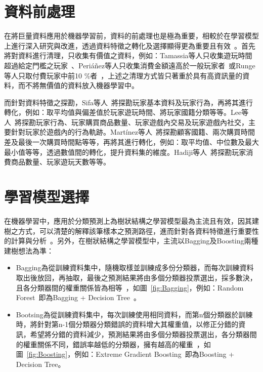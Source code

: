 \section{資料前處理}

在將巨量資料應用於機器學習前，資料的前處理也是極為重要，相較於在學習模型上進行深入研究與改進，透過資料特徵之轉化及選擇顯得更為重要且有效~\cite{lee2018game}。首先將對資料進行清理，只收集有價值之資料，例如：Tamassia等人只收集遊玩時間超過給定門檻之玩家~\cite{tamassia2016predicting}、Periáñez等人只收集消費金額遠高於一般玩家者~\cite{perianez2016churn}或Runge等人只取付費玩家中前10 \%者~\cite{runge2014churn}，上述之清理方式皆只著重於具有高資訊量的資料，而不將無價值的資料放入機器學習中。

而針對資料特徵之探勘，Sifa等人~\cite{sifa2015predicting}將探勘玩家基本資料及玩家行為，再將其進行轉化，例如：取平均值與偏差值於玩家遊玩時間、將玩家國籍分類等等。Lee等人~\cite{lee2016predicting}將探勘玩家行為、玩家購買商品數量、玩家遊戲內交易及玩家遊戲內社交，主要針對玩家於遊戲內的行為軌跡。Martínez等人~\cite{martinez2020machine}將探勘顧客國籍、兩次購買時間差及最後一次購買時間點等等，再將其進行轉化，例如：取平均值、中位數及最大最小值等等，透過數值間的轉化，提升資料集的維度。Hadiji等人~\cite{6932876}將探勘玩家消費商品數量、玩家遊玩天數等等。

\section{學習模型選擇}

在機器學習中，應用於分類預測上為樹狀結構之學習模型最為主流且有效，因其建樹之方式，可以清楚的解釋該筆樣本之預測路徑，進而針對各資料特徵進行重要性的計算與分析~\cite{lee2018game}。另外，在樹狀結構之學習模型中，主流以Bagging及Boosting兩種建樹想法為準：

\begin{itemize}
    \item Bagging為從訓練資料集中，隨機取樣並訓練成多份分類器，而每次訓練資料取出後放回，再抽取，最後之預測結果將由多個分類器投票選出，採多數決，且各分類器間的權重關係皆為相等~\cite{breiman1996bagging}，如圖~\ref{fig:Bagging}，例如：Random Forest~\cite{breiman2001random}即為Bagging + Decision Tree~\cite{breiman1984classification}。
    \item Bootsing為從訓練資料集中，每次訓練使用相同資料，而第n個分類器於訓練時，將針對第n-1個分類器分類錯誤的資料增大其權重值，以修正分錯的資訊，希望將分錯的資料減少，預測結果將由多個分類器投票選出，各分類器間的權重關係不同，錯誤率越低的分類器，擁有越高的權重~\cite{freund1999short}，如圖~\ref{fig:Boosting}，例如：Extreme Gradient Boosting~\cite{chen2016xgboost}即為Boosting + Decision Tree。
\end{itemize}
\newpage

